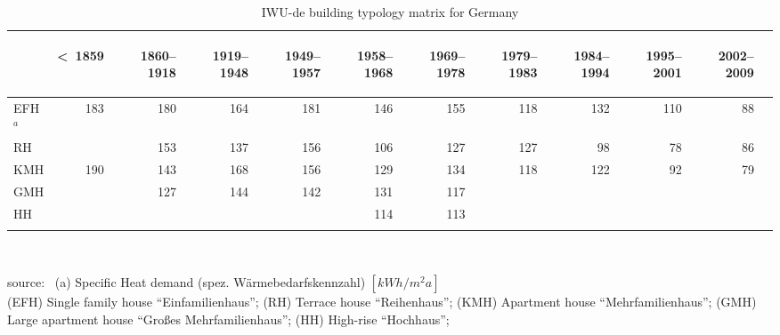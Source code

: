 \begin{table}[htbp]
  \centering
  \caption{IWU-de building typology matrix for Germany}\label{tab:IWU-de}%
    \begin{tabular}{l r rrr rrr rrr r}
    \addlinespace
    \toprule
    &
    \begin{sideways}\textless~1859\end{sideways}&  %
    \begin{sideways}1860--1918\end{sideways}&     %
    \begin{sideways}1919--1948\end{sideways}&     %
    \begin{sideways}1949--1957\end{sideways}&     %
    \begin{sideways}1958--1968\end{sideways}&     %
    \begin{sideways}1969--1978\end{sideways}&     %
    \begin{sideways}1979--1983\end{sideways}&     %
    \begin{sideways}1984--1994\end{sideways}&     %
    \begin{sideways}1995--2001\end{sideways}&     %
    \begin{sideways}2002--2009\end{sideways}\\    %
    \midrule
EFH$^a$&183&180&164&181&146&155&118&132&110&88\\
RH     &   &153&137&156&106&127&127& 98& 78&86\\
KMH    &190&143&168&156&129&134&118&122& 92&79\\
GMH    &   &127&144&142&131&117&   &   &   &  \\
HH     &   &   &   &   &114&113&   &   &   &  \\
    \bottomrule
    \addlinespace
    \end{tabular}\\
    \begin{footnotesize}    
    source:~\cite{Loga.2011} 
    (a) Specific Heat demand (spez. W\"armebedarfskennzahl)
    $[kWh/m^{2}a]$\\
(EFH) Single family house ``Einfamilienhaus'';
(RH) Terrace house ``Reihenhaus'';
(KMH) Apartment house ``Mehrfamilienhaus'';
(GMH) Large apartment house ``Großes Mehrfamilienhaus'';
(HH) High-rise ``Hochhaus'';
    \end{footnotesize}
\end{table}
